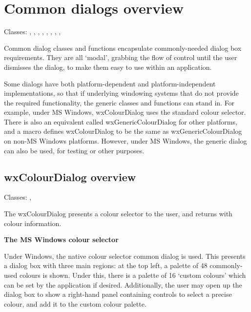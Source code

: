 \section{Common dialogs overview}\label{commondialogsoverview}

Classes: , ,
\rtfsp{}, ,\rtfsp
{}, ,\rtfsp
{}, ,\rtfsp
{}

Common dialog classes and functions encapsulate commonly-needed dialog box requirements.
They are all `modal', grabbing the flow of control until the user dismisses the dialog,
to make them easy to use within an application.

Some dialogs have both platform-dependent and platform-independent implementations,
so that if underlying windowing systems that do not provide the required functionality,
the generic classes and functions can stand in. For example, under MS Windows, wxColourDialog
uses the standard colour selector. There is also an equivalent called wxGenericColourDialog
for other platforms, and a macro defines wxColourDialog to be the same as wxGenericColourDialog
on non-MS Windows platforms. However, under MS Windows, the generic dialog can also be
used, for testing or other purposes.

\subsection{wxColourDialog overview}\label{wxcolourdialogoverview}

Classes: , 

The wxColourDialog presents a colour selector to the user, and returns
with colour information.

{\bf The MS Windows colour selector}

Under Windows, the native colour selector common dialog is used. This
presents a dialog box with three main regions: at the top left, a
palette of 48 commonly-used colours is shown. Under this, there is a
palette of 16 `custom colours' which can be set by the application if
desired. Additionally, the user may open up the dialog box to show
a right-hand panel containing controls to select a precise colour, and add
it to the custom colour palette.

